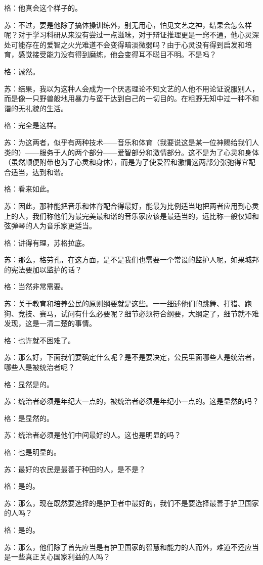 \documentclass[12pt,oneside]{book}
\begin{document}
格：他真会这个样子的。

苏：不过，要是他除了搞体操训练外，别无用心，怕见文艺之神，结果会怎么样呢？对于学习科研从来没有尝过一点滋味，对于辩证推理更是一窍不通，他心灵深处可能存在的爱智之火光难道不会变得暗淡微弱吗？由于心灵没有得到启发和培育，感觉接受能力没有得到磨练，他会变得耳不聪目不明。不是吗？

格：诚然。

苏：结果，我以为这种人会成为一个厌恶理论不知文艺的人他不用论证说服别人，而是像一只野兽般地用暴力与蛮干达到自己的一切目的。在粗野无知中过一种不和谐的无礼貌的生活。

格：完全是这样。

苏：为这两者，似乎有两种技术——音乐和体育（我要说这是某一位神赐给我们人类的）——服务于人的两个部分——爱智部分和激情部分。这不是为了心灵和身体（虽然顺便附带也为了心灵和身体），而是为了使爱智和激情这两部分张弛得宜配合适当，达到和谐。

格：看来如此。

苏：因此，那种能把音乐和体育配合得最好，能最为比例适当地把两者应用到心灵上的人，我们称他们为最完美最和谐的音乐家应该是最适当的，远比称一般仅知和弦弹琴的人为音乐家更适当。

格：讲得有理，苏格拉底。

苏：那么，格劳孔，在这方面，是不是我们也需要一个常设的监护人呢，如果城邦的宪法要加以监护的话？

格：当然非常需要。

苏：关于教育和培养公民的原则纲要就是这些。一一细述他们的跳舞、打猎、跑狗、竞技、赛马，试问有什么必要呢？细节必须符合纲要，大纲定了，细节就不难发现，这是一清二楚的事情。

格：也许就不困难了。

苏：那么好，下面我们要确定什么呢？是不是要决定，公民里面哪些人是统治者，哪些人是被统治者呢？

格：显然是的。

苏：统治者必须是年纪大一点的，被统治者必须是年纪小一点的。这是显然的吗？

格：是显然的。

苏：统治者必须是他们中间最好的人。这也是明显的吗？

格：也是明显的。

苏：最好的农民是最善于种田的人，是不是？

格：是的。

苏：那么，现在既然要选择的是护卫者中最好的，我们不是要选择最善于护卫国家的人吗？

格：是的。

苏：那么，他们除了首先应当是有护卫国家的智慧和能力的人而外，难道不还应当是一些真正关心国家利益的人吗？
\end{document}

